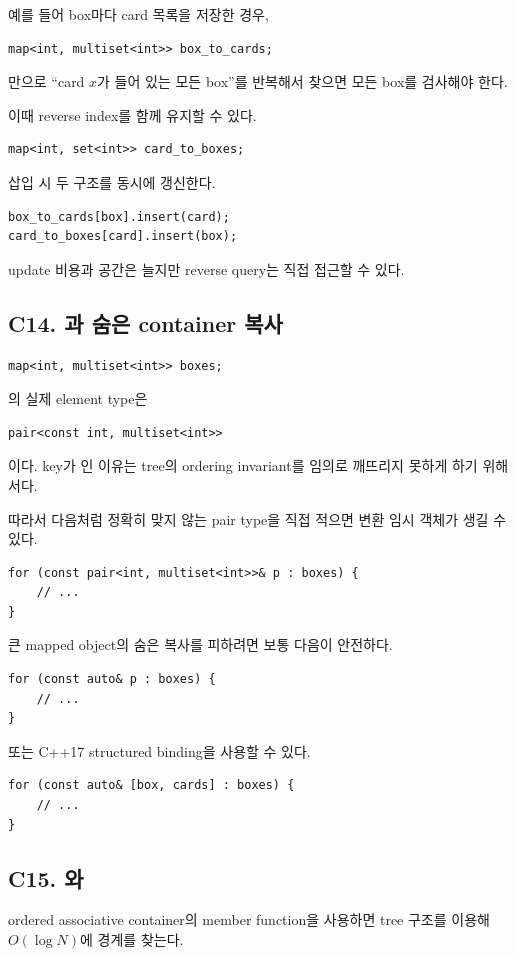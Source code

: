 예를 들어 box마다 card 목록을 저장한 경우,
\begin{lstlisting}
map<int, multiset<int>> box_to_cards;
\end{lstlisting}
만으로 ``card $x$가 들어 있는 모든 box''를 반복해서 찾으면 모든 box를 검사해야 한다.

이때 reverse index를 함께 유지할 수 있다.
\begin{lstlisting}
map<int, set<int>> card_to_boxes;
\end{lstlisting}

삽입 시 두 구조를 동시에 갱신한다.
\begin{lstlisting}
box_to_cards[box].insert(card);
card_to_boxes[card].insert(box);
\end{lstlisting}

update 비용과 공간은 늘지만 reverse query는 직접 접근할 수 있다.

\subsection{C14. 과 숨은 container 복사}
\begin{lstlisting}
map<int, multiset<int>> boxes;
\end{lstlisting}
의 실제 element type은
\begin{lstlisting}
pair<const int, multiset<int>>
\end{lstlisting}
이다. key가 인 이유는 tree의 ordering invariant를 임의로 깨뜨리지 못하게 하기 위해서다.

따라서 다음처럼 정확히 맞지 않는 pair type을 직접 적으면 변환 임시 객체가 생길 수 있다.
\begin{lstlisting}
for (const pair<int, multiset<int>>& p : boxes) {
    // ...
}
\end{lstlisting}

큰 mapped object의 숨은 복사를 피하려면 보통 다음이 안전하다.
\begin{lstlisting}
for (const auto& p : boxes) {
    // ...
}
\end{lstlisting}

또는 C++17 structured binding을 사용할 수 있다.
\begin{lstlisting}
for (const auto& [box, cards] : boxes) {
    // ...
}
\end{lstlisting}

\subsection{C15. 와 }
ordered associative container의 member function을 사용하면 tree 구조를 이용해 $O(\log N)$에 경계를 찾는다.

